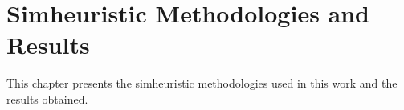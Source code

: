 \chapter{Simheuristic Methodologies and Results}
\label{chp:simheuristic-methodologies-and-results}

This chapter presents the simheuristic methodologies used in this work and the results obtained.